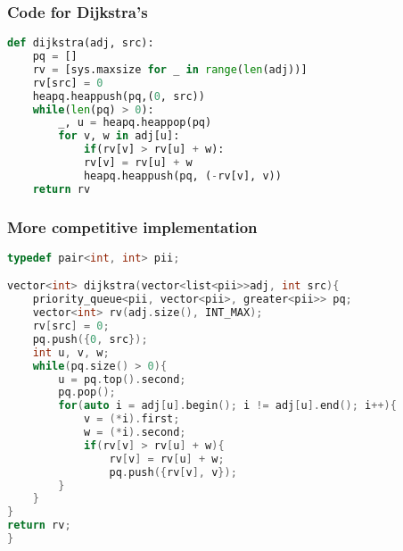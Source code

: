 \documentclass{beamer}
\begin{document}
\begin{frame}[fragile]
    \frametitle{Code for Dijkstra's}
             \begin{lstlisting}[language=Python]
def dijkstra(adj, src):
    pq = []
    rv = [sys.maxsize for _ in range(len(adj))]
    rv[src] = 0
    heapq.heappush(pq,(0, src))
    while(len(pq) > 0):
    	_, u = heapq.heappop(pq)
    	for v, w in adj[u]:
    		if(rv[v] > rv[u] + w):
    		rv[v] = rv[u] + w
    		heapq.heappush(pq, (-rv[v], v))
    return rv
  \end{lstlisting}
    \end{frame}
\begin{frame}[fragile]
    \frametitle{More competitive implementation}
    \begin{lstlisting}[language=c,basicstyle=\small]
typedef pair<int, int> pii;

vector<int> dijkstra(vector<list<pii>>adj, int src){
    priority_queue<pii, vector<pii>, greater<pii>> pq;
    vector<int> rv(adj.size(), INT_MAX);
    rv[src] = 0;
    pq.push({0, src});
    int u, v, w;
    while(pq.size() > 0){
    	u = pq.top().second;
    	pq.pop();
    	for(auto i = adj[u].begin(); i != adj[u].end(); i++){
    		v = (*i).first;
    		w = (*i).second;
    		if(rv[v] > rv[u] + w){
    			rv[v] = rv[u] + w;
    			pq.push({rv[v], v});
		}
	}
}
return rv;
}
    \end{lstlisting}
\end{frame}
\end{document}
